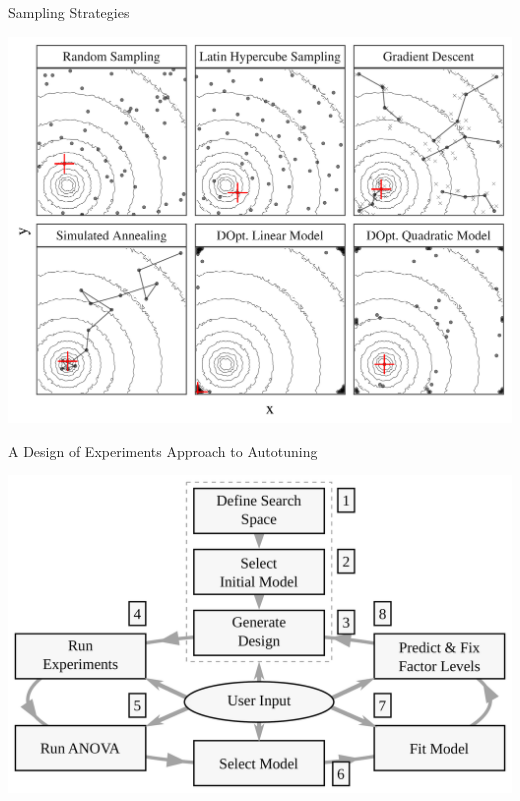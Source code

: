 \documentclass[10pt, compress, aspectratio=169, xcolor={table,usenames,dvipsnames}]{beamer}
\begin{document}
\begin{frame}[label={sec:orgce15543}]{Sampling Strategies}
\begin{center}
\begin{center}
\includegraphics[width=.70\textwidth]{../../../img/sampling_comparison.pdf}
\end{center}
\end{center}
\end{frame}

\begin{frame}[label={sec:org45bcebd}]{A Design of Experiments Approach to Autotuning}
\begin{center}
\begin{center}
\includegraphics[width=.72\linewidth]{../../../img/doe_anova_strategy.pdf}
\end{center}

\vspace{-.2cm}
\end{center}
\end{frame}
\end{document}
